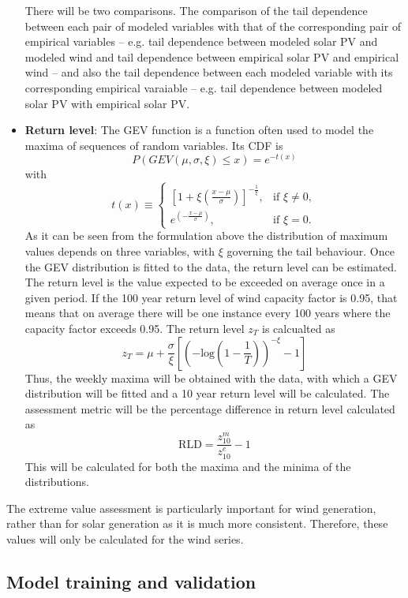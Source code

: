 \begin{itemize}
    There will be two comparisons. The comparison of the tail dependence between each pair of modeled variables with that of the corresponding pair of empirical variables -- e.g. tail dependence between modeled solar PV and modeled wind and tail dependence between empirical solar PV and empirical wind -- and also the tail dependence between each modeled variable with its corresponding empirical varaiable -- e.g. tail dependence between modeled solar PV with empirical solar PV.  
    \item \textbf{Return level}: The GEV function is a function often used to model the maxima of sequences of random variables. Its CDF is
    \begin{equation}
        P\left(GEV\left(\mu,\sigma,\xi\right)\leq x\right)=e^{-t\left(x\right)}
    \end{equation}
    with
    \begin{equation}
        t\left(x\right)\equiv 
        \begin{cases} 
        \left[ 1 + \xi \left( \frac{x - \mu}{\sigma} \right) \right]^{- \frac{1}{\xi}}, & \text{if } \xi \neq 0, \\
        e^{\left( - \frac{x - \mu}{\sigma} \right)}, & \text{if } \xi = 0.
        \end{cases}
    \end{equation}
    As it can be seen from the formulation above the distribution of maximum values depends on three variables, with $\xi$ governing the tail behaviour. Once the GEV distribution is fitted to the data, the return level can be estimated. The return level is the value expected to be exceeded on average once in a given period. If the 100 year return level of wind capacity factor is 0.95, that means that on average there will be one instance every 100 years where the capacity factor exceeds 0.95. The return level $z_T$ is calcualted as 
    \begin{equation}
        z_T=\mu+\frac{\sigma}{\xi}\left[\left(-\text{log}\left(1-\frac{1}{T}\right)\right)^{-\xi}-1\right]
    \end{equation}
    Thus, the weekly maxima will be obtained with the data, with which a GEV distribution will be fitted and a 10 year return level will be calculated. The assessment metric will be the percentage difference in return level calculated as 
    \begin{equation}
        \text{RLD}=\frac{z^m_{10}}{z^e_{10}}-1
    \end{equation}
    This will be calculated for both the maxima and the minima of the distributions. 
\end{itemize}

The extreme value assessment is particularly important for wind generation, rather than for solar generation as it is much more consistent. Therefore, these values will only be calculated for the wind series. 

\subsection{Model training and validation}